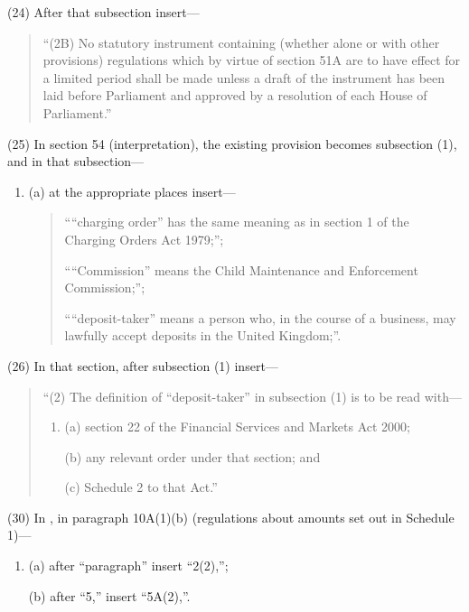 \documentclass[a4paper]{article}
\begin{document}
(24) After that subsection insert—
\begin{quotation}
“(2B) No statutory instrument containing (whether alone or with other provisions) regulations which by virtue of section 51A are to have effect for a limited period shall be made unless a draft of the instrument has been laid before Parliament and approved by a resolution of each House of Parliament.”
\end{quotation}

(25) In section 54 (interpretation), the existing provision becomes subsection (1), and in that subsection—
\begin{enumerate}\item[]
(a) at the appropriate places insert—
\begin{quotation}
““charging order” has the same meaning as in section 1 of the Charging Orders Act 1979;”;

““Commission” means the Child Maintenance and Enforcement Commission;”;

““deposit-taker” means a person who, in the course of a business, may lawfully accept deposits in the United Kingdom;”.
\end{quotation}
\end{enumerate}

(26) In that section, after subsection (1) insert—
\begin{quotation}
“(2) The definition of “deposit-taker” in subsection (1) is to be read with—
\begin{enumerate}\item[]
(a) section 22 of the Financial Services and Markets Act 2000;

(b) any relevant order under that section; and

(c) Schedule 2 to that Act.”
\end{enumerate}
\end{quotation}


(30) In , in paragraph 10A(1)(b) (regulations about amounts set out in Schedule 1)—
\begin{enumerate}\item[]
(a) after “paragraph” insert  “2(2),”;

(b) after “5,” insert  “5A(2),”.
\end{enumerate}
\end{document}
